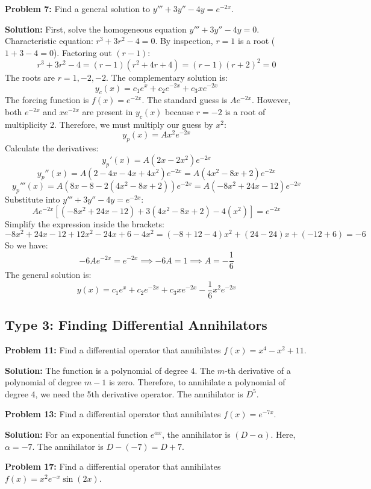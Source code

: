\documentclass[11pt]{article}
\begin{document}
\vspace{0.5cm}
\textbf{Problem 7:} Find a general solution to $y''' + 3y'' - 4y = e^{-2x}$.

\textbf{Solution:}
First, solve the homogeneous equation $y''' + 3y'' - 4y = 0$.
Characteristic equation: $r^3 + 3r^2 - 4 = 0$.
By inspection, $r = 1$ is a root ($1 + 3 - 4 = 0$). Factoring out $(r - 1)$:
\[ r^3 + 3r^2 - 4 = (r - 1)(r^2 + 4r + 4) = (r - 1)(r + 2)^2 = 0 \]
The roots are $r = 1, -2, -2$. The complementary solution is:
\[ y_c(x) = c_1 e^x + c_2 e^{-2x} + c_3 x e^{-2x} \]
The forcing function is $f(x) = e^{-2x}$. The standard guess is $A e^{-2x}$. However, both $e^{-2x}$ and $x e^{-2x}$ are present in $y_c(x)$ because $r = -2$ is a root of multiplicity 2. Therefore, we must multiply our guess by $x^2$:
\[ y_p(x) = A x^2 e^{-2x} \]
Calculate the derivatives:
\[ y_p'(x) = A(2x - 2x^2)e^{-2x} \]
\[ y_p''(x) = A(2 - 4x - 4x + 4x^2)e^{-2x} = A(4x^2 - 8x + 2)e^{-2x} \]
\[ y_p'''(x) = A(8x - 8 - 2(4x^2 - 8x + 2))e^{-2x} = A(-8x^2 + 24x - 12)e^{-2x} \]
Substitute into $y''' + 3y'' - 4y = e^{-2x}$:
\[ A e^{-2x} [ (-8x^2 + 24x - 12) + 3(4x^2 - 8x + 2) - 4(x^2) ] = e^{-2x} \]
Simplify the expression inside the brackets:
\[ -8x^2 + 24x - 12 + 12x^2 - 24x + 6 - 4x^2 = (-8 + 12 - 4)x^2 + (24 - 24)x + (-12 + 6) = -6 \]
So we have:
\[ -6A e^{-2x} = e^{-2x} \implies -6A = 1 \implies A = -\frac{1}{6} \]
The general solution is:
\[ y(x) = c_1 e^x + c_2 e^{-2x} + c_3 x e^{-2x} - \frac{1}{6} x^2 e^{-2x} \]

\subsection{Type 3: Finding Differential Annihilators}

\textbf{Problem 11:} Find a differential operator that annihilates $f(x) = x^4 - x^2 + 11$.

\textbf{Solution:}
The function is a polynomial of degree 4. The $m$-th derivative of a polynomial of degree $m-1$ is zero. Therefore, to annihilate a polynomial of degree 4, we need the 5th derivative operator.
The annihilator is $D^5$.

\vspace{0.5cm}
\textbf{Problem 13:} Find a differential operator that annihilates $f(x) = e^{-7x}$.

\textbf{Solution:}
For an exponential function $e^{\alpha x}$, the annihilator is $(D - \alpha)$. Here, $\alpha = -7$.
The annihilator is $D - (-7) = D + 7$.

\vspace{0.5cm}
\textbf{Problem 17:} Find a differential operator that annihilates $f(x) = x^2 e^{-x} \sin(2x)$.
\end{document}
